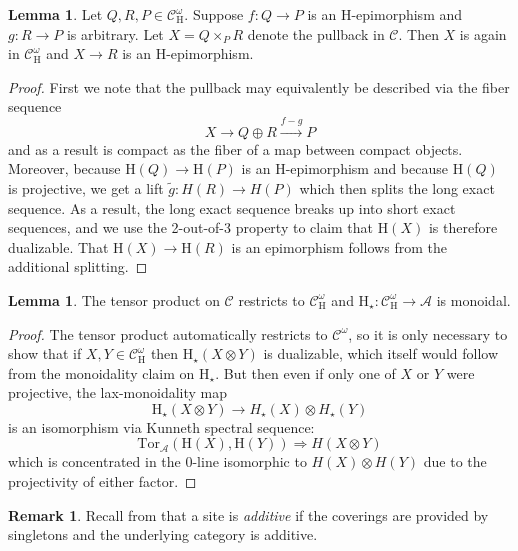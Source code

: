 \documentclass[10pt]{amsart}
\theoremstyle{definition}
\numberwithin{figure}{section}
\numberwithin{equation}{section}
\newtheorem{lemma}[figure]{Lemma}
\newtheorem{remark}[figure]{Remark}
\newcommand{\cA}{\mathcal{A}}
\newcommand{\cC}{\mathcal{C}}
\theoremstyle{cited}
\renewcommand{\H}{\mathrm{H}}
\newcommand{\Tor}{\mathrm{Tor}}
\begin{document}
\begin{lemma}
  \label{lem:sitepullbacks}
  Let $Q,R,P\in \cC^\omega_\H$. Suppose $f:Q\to P$ is an $\H$-epimorphism and $g:R\to P$ is arbitrary. Let $X=Q\times_P R$ denote the pullback in $\cC$. Then $X$ is again in $\cC^\omega_\H$ and $X\to R$ is an $\H$-epimorphism.
\end{lemma}

\begin{proof}
  First we note that the pullback may equivalently be described via the fiber sequence
  \[
  X\to Q\oplus R \xrightarrow{f-g} P
  \]
  and as a result is compact as the fiber of a map between compact objects. Moreover, because $\H(Q)\to \H(P)$ is an $\H$-epimorphism and because $\H(Q)$ is projective, we get a lift $\tilde g:H(R)\to H(P)$ which then splits the long exact sequence. As a result, the long exact sequence breaks up into short exact sequences, and we use the 2-out-of-3 property to claim that $\H(X)$ is therefore dualizable. That $\H(X)\to \H(R)$ is an epimorphism follows from the additional splitting.
\end{proof}

\begin{lemma}
  \label{lem:sitetensors}
The tensor product on $\cC$ restricts to $\cC^\omega_{\H}$ and $\H_\star:\cC^\omega_\H\to \cA$ is monoidal.
\end{lemma}

\begin{proof}
  The tensor product automatically restricts to $\cC^\omega$, so it is only necessary to show that if $X,Y\in \cC^\omega_\H$ then $\H_\star(X\otimes Y)$ is dualizable, which itself would follow from the monoidality claim on $\H_\star$. But then even if only one of $X$ or $Y$ were projective, the lax-monoidality map
  \[
  \H_\star(X\otimes Y)\to H_\star(X)\otimes H_\star(Y)
  \]
  is an isomorphism via Kunneth spectral sequence:
  \[
  \Tor_{\cA}(\H(X),\H(Y))\Rightarrow H(X\otimes Y)
  \]
  which is concentrated in the $0$-line isomorphic to $H(X)\otimes H(Y)$ due to the projectivity of either factor.
\end{proof}


\begin{remark}
  Recall from \cite{Pst22} that a site is \textit{additive} if the coverings are provided by singletons and the underlying category is additive. 
\end{remark}
\end{document}
